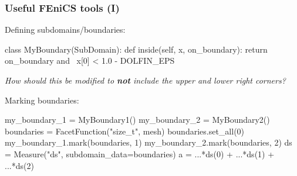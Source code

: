 \begin{frame}[fragile]
  \frametitle{Useful FEniCS tools (I)}

  \linespread{1.0}

  Defining subdomains/boundaries:
  \vspace{-0.5cm}
\begin{python}
class MyBoundary(SubDomain):
    def inside(self, x, on_boundary):
        return on_boundary and \
               x[0] < 1.0 - DOLFIN_EPS
\end{python}
\footnotesize
\emph{How should this be modified to \textbf{not} include the upper and lower right corners?}
\normalsize

  Marking boundaries:
  \vspace{-0.5cm}
  \begin{python}
my_boundary_1 = MyBoundary1()
my_boundary_2 = MyBoundary2()
boundaries = FacetFunction("size_t", mesh)
boundaries.set_all(0)
my_boundary_1.mark(boundaries, 1)
my_boundary_2.mark(boundaries, 2)
ds = Measure("ds", subdomain_data=boundaries)
a = ...*ds(0) + ...*ds(1) + ...*ds(2)
  \end{python}

  \linespread{1.5}

\end{frame}
